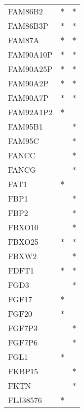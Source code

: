 \begin{longtable}{lcc}
FAM86B2               &              * &          * \\
FAM86B3P              &              * &          * \\
FAM87A                &              * &          * \\
FAM90A10P             &              * &          * \\
FAM90A25P             &              * &          * \\
FAM90A2P              &              * &          * \\
FAM90A7P              &              * &          * \\
FAM92A1P2             &              * &            \\
FAM95B1               &                &          * \\
FAM95C                &                &          * \\
FANCC                 &                &          * \\
FANCG                 &                &          * \\
FAT1                  &              * &            \\
FBP1                  &                &          * \\
FBP2                  &                &          * \\
FBXO10                &                &          * \\
FBXO25                &              * &          * \\
FBXW2                 &                &          * \\
FDFT1                 &              * &          * \\
FGD3                  &                &          * \\
FGF17                 &              * &            \\
FGF20                 &              * &            \\
FGF7P3                &                &          * \\
FGF7P6                &                &          * \\
FGL1                  &              * &            \\
FKBP15                &                &          * \\
FKTN                  &                &          * \\
FLJ38576              &              * &            \\

\end{longtable}
